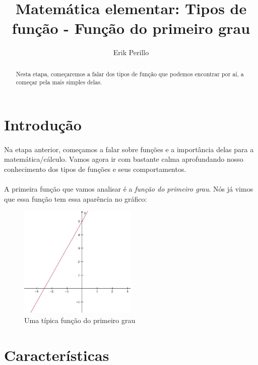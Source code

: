\documentclass[11pt]{article}
\begin{document}
\title{Matemática elementar: Tipos de função - Função do primeiro grau}
\author{Erik Perillo}
\date{}
\maketitle
\begin{abstract}
Nesta etapa, começaremos a falar dos tipos de função que podemos encontrar por
aí, a começar pela mais simples delas.
\end{abstract}

\newpage

\tableofcontents

\newpage

\section{Introdução}
\paragraph{}
Na etapa anterior, começamos a falar sobre funções e a importância delas para
a matemática/cálculo. Vamos agora ir com bastante calma aprofundando nosso 
conhecimento dos tipos de funções e seus comportamentos. 
\paragraph{}
A primeira função que vamos analisar é a \emph{função do primeiro grau}. Nós
já vimos que essa função tem essa aparência no gráfico:
\begin{figure}[H]
\centering
\includegraphics[width=0.5\textwidth]{imgs/funcao_afim.jpg}
\caption[9pt]{Uma típica função do primeiro grau}
\end{figure}

\section{Características}
\end{document}
